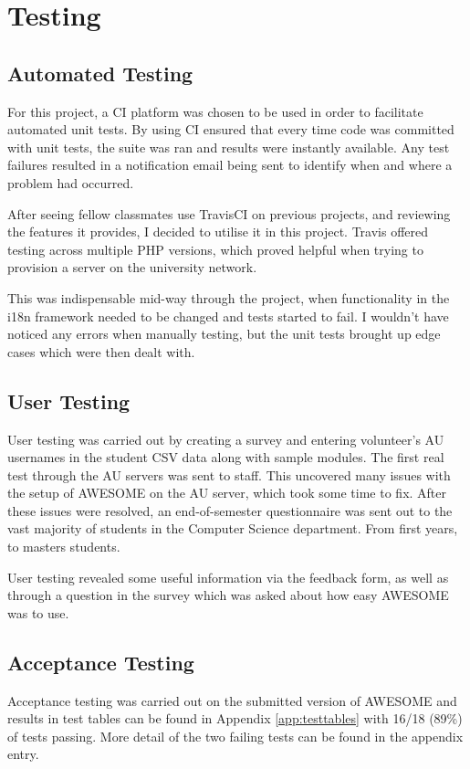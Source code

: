 \chapter{Testing}
	
	\section{Automated Testing}
	\label{sec:automatedtesting}
	
	For this project, a \ac{CI} platform was chosen to be used in order to facilitate automated unit tests.
	By using \ac{CI} ensured that every time code was committed with unit tests, the suite was ran and results were instantly available.
	Any test failures resulted in a notification email being sent to identify when and where a problem had occurred.
	
	After seeing fellow classmates use TravisCI on previous projects, and reviewing the features it provides, I decided to utilise it in this project.
	Travis offered testing across multiple PHP versions, which proved helpful when trying to provision a server on the university network.
	
	This was indispensable mid-way through the project, when functionality in the \ac{i18n} framework needed to be changed and tests started to fail.
	I wouldn't have noticed any errors when manually testing, but the unit tests brought up edge cases which were then dealt with.
	
	\section{User Testing}
	
	User testing was carried out by creating a survey and entering volunteer's \ac{AU} usernames in the student \ac{CSV} data along with sample modules.
	The first real test through the \ac{AU} servers was sent to staff.
	This uncovered many issues with the setup of \ac{AWESOME} on the \ac{AU} server, which took some time to fix.
	After these issues were resolved, an end-of-semester questionnaire was sent out to the vast majority of students in the Computer Science department.
	From first years, to masters students.
	
	User testing revealed some useful information via the feedback form, as well as through a question in the survey which was asked about how easy \ac{AWESOME} was to use.
	
	\section{Acceptance Testing}
	
	Acceptance testing was carried out on the submitted version of \ac{AWESOME} and results in test tables can be found in Appendix \autoref{app:testtables} with 16/18 (89\%) of tests passing.
	More detail of the two failing tests can be found in the appendix entry.
